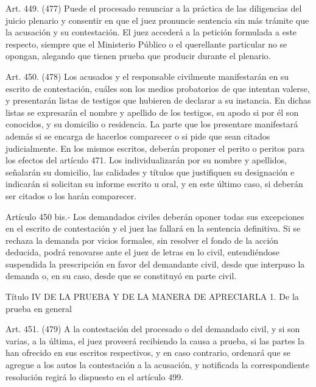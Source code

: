    Art. 449. (477) Puede el procesado renunciar a la práctica de las diligencias del juicio plenario y consentir en que el juez pronuncie sentencia sin más trámite que la acusación y su contestación. El juez accederá a la petición formulada a este respecto, siempre que el Ministerio Público o el querellante particular no se opongan, alegando que tienen prueba que producir durante el plenario.





    Art. 450. (478) Los acusados y el responsable civilmente manifestarán en su escrito de contestación, cuáles son los medios probatorios de que intentan valerse, y presentarán listas de testigos que hubieren de declarar a su instancia.
    En dichas listas se expresarán el nombre y apellido de los testigos, su apodo si por él son conocidos, y su domicilio o residencia. La parte que los presentare manifestará además si se encarga de hacerlos comparecer o si pide que sean citados judicialmente.
    En los mismos escritos, deberán proponer el perito o peritos para los efectos del artículo 471. Los individualizarán por su nombre y apellidos, señalarán su domicilio, las calidades y títulos que justifiquen su designación e indicarán si solicitan su informe escrito u oral, y en este último caso, si deberán ser citados o los harán comparecer.

    Artículo 450 bis.- Los demandados civiles deberán oponer todas sus excepciones en el escrito de contestación y el juez las fallará en la sentencia definitiva.
    Si se rechaza la demanda por vicios formales, sin resolver el fondo de la acción deducida, podrá renovarse ante el juez de letras en lo civil, entendiéndose suspendida la prescripción en favor del demandante civil, desde que interpuso la demanda o, en su caso, desde que se constituyó en parte civil.

  Título IV
  DE LA PRUEBA Y DE LA MANERA DE APRECIARLA
  1. De la prueba en general

    Art. 451. (479) A la contestación del procesado o del demandado civil, y si son varias, a la última, el juez proveerá recibiendo la causa a prueba, si las partes la han ofrecido en sus escritos respectivos, y en caso contrario, ordenará que se agregue a los autos la contestación a la acusación, y notificada la correspondiente resolución regirá lo dispuesto en el artículo 499.
   
   
   
     


